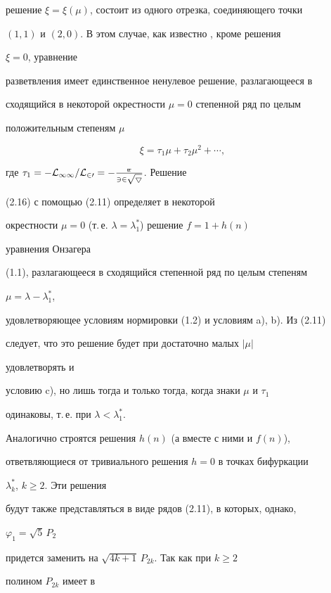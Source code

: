 решение $\xi=\xi(\mu)$, состоит из одного отрезка, соединяющего точки


$(1,1)$ и $(2,0)$. В этом случае, как известно \cite{2}, кроме решения


$\xi=0$, уравнение


разветвления имеет единственное ненулевое решение, разлагающееся в


сходящийся в некоторой окрестности $\mu=0$ степенной ряд по целым


положительным степеням $\mu$


\begin{equation}


\xi=\tau_1\mu+\tau_2\mu^2+\dotsb,


\tag{2.16}


\end{equation}


где $\tau_1=-\cal L_{11}/\cal L_{20}=-\frac{7\pi}{32\sqrt{5}}$. Решение


(2.16) с помощью (2.11) определяет в некоторой


окрестности $\mu=0$ (т.\,е. $\lambda=\lambda^*_1$) решение $f=1+h(n)$


уравнения Онзагера


(1.1), разлагающееся в сходящийся степенной ряд по целым степеням


$\mu=\lambda-\lambda^*_1$,


удовлетворяющее условиям нормировки (1.2) и условиям a), b). Из (2.11)


следует, что это решение будет при достаточно малых $|\mu|$


удовлетворять и


условию c), но лишь тогда и только тогда, когда знаки $\mu$ и $\tau_1$


одинаковы, т.\,е. при $\lambda<\lambda^*_1$.





Аналогично строятся решения $h(n)$ (а вместе с ними и $f(n)$),


ответвляющиеся от тривиального решения $h=0$ в точках бифуркации


$\lambda^*_k$, $k\ge 2$. Эти решения


будут также представляться в виде рядов (2.11), в которых, однако,


$\varphi_1=\sqrt{5}\,P_2$


придется заменить на $\sqrt{4k+1}\,P_{2k}$. Так как при $k\ge 2$


полином $P_{2k}$ имеет в


